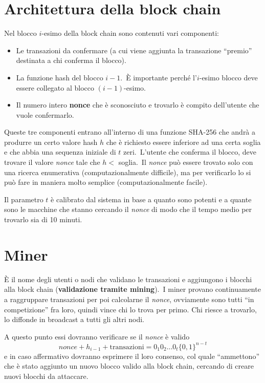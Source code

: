 \section{Architettura della block chain}

Nel blocco $i$-esimo della block chain sono contenuti vari componenti:
\begin{itemize}
    \item Le transazioni da confermare (a cui viene aggiunta la transazione ``premio'' destinata a chi conferma il blocco).
    \item La funzione hash del blocco $i-1$.\ È importante perché l'$i$-esimo blocco deve essere collegato al blocco $(i-1)$-esimo.
    \item Il numero intero \textbf{nonce} che è sconosciuto e trovarlo è compito dell'utente che vuole confermarlo.
\end{itemize}

\noindent Queste tre componenti entrano all'interno di una funzione SHA-256 che andrà a produrre un certo valore hash $h$ che è richiesto essere inferiore ad una certa soglia e che abbia una sequenza iniziale di $t$ zeri.\
L'utente che conferma il blocco, deve trovare il valore \textit{nonce} tale che $h <$ soglia.\
Il \textit{nonce} può essere trovato solo con una ricerca enumerativa (computazionalmente difficile), ma per verificarlo lo si può fare in maniera molto semplice (computazionalmente facile).\

Il parametro $t$ è calibrato dal sistema in base a quanto sono potenti e a quante sono le macchine che stanno cercando il \textit{nonce} di modo che il tempo medio per trovarlo sia di 10 minuti.\

\section{Miner}

È il nome degli utenti o nodi che validano le transazioni e aggiungono i blocchi alla block chain (\textbf{validazione tramite mining}).\
I miner provano continuamente a raggruppare transazioni per poi calcolarne il \textit{nonce}, ovviamente sono tutti ``in competizione'' fra loro, quindi vince chi lo trova per primo.
Chi riesce a trovarlo, lo diffonde in broadcast a tutti gli altri nodi.\

A questo punto essi dovranno verificare se il \textit{nonce} è valido
\[\mathit{nonce} + h_{i-1} + \mathrm{transazioni} = 0_1 0_2 \dots 0_t \{0,1\}^{n-t}\]
e in caso affermativo dovranno esprimere il loro consenso, col quale ``ammettono'' che è stato aggiunto un nuovo blocco valido alla block chain, cercando di creare nuovi blocchi da attaccare.\

